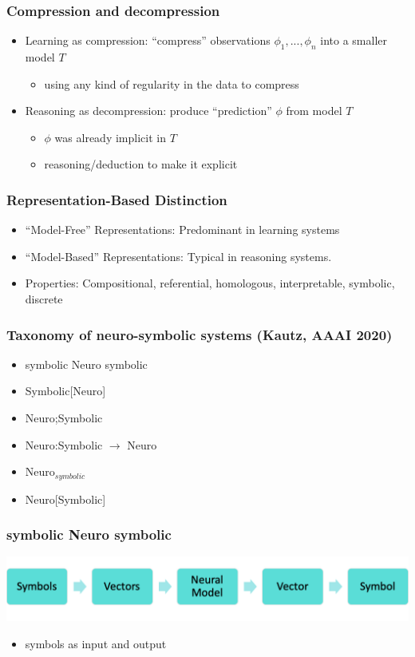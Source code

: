 \documentclass{beamer}
\begin{document}
\begin{frame}
  \frametitle{Compression and decompression}
  \begin{itemize}
  \item Learning as compression: ``compress'' observations
    $\phi_1,...,\phi_n$ into a smaller model $T$
    \begin{itemize}
    \item using any kind of regularity in the data to compress
    \end{itemize}
  \item Reasoning as decompression: produce ``prediction'' $\phi$ from
    model $T$
    \begin{itemize}
    \item $\phi$ was already implicit in $T$
    \item reasoning/deduction to make it explicit
    \end{itemize}
  \end{itemize}
\end{frame}

\begin{frame}
\frametitle{Representation-Based Distinction}
\begin{itemize}
\item ``Model-Free'' Representations: Predominant in learning systems
\item ``Model-Based'' Representations: Typical in reasoning systems.
\item Properties: Compositional, referential, homologous,
  interpretable, symbolic, discrete
\end{itemize}
\end{frame}

\begin{frame}
  \frametitle{Taxonomy of neuro-symbolic systems (Kautz, AAAI 2020)}
  \begin{itemize}
  \item symbolic Neuro symbolic
  \item Symbolic[Neuro]
  \item Neuro;Symbolic
  \item Neuro:Symbolic $\rightarrow$ Neuro
  \item Neuro$_{symbolic}$
  \item Neuro[Symbolic]
  \end{itemize}
\end{frame}

\begin{frame}
  \frametitle{symbolic Neuro symbolic}
  \centering
  \includegraphics[width=.7\textwidth]{ns10.png}
  \begin{itemize}
  \item symbols as input and output
  \end{itemize}
\end{frame}
\end{document}
